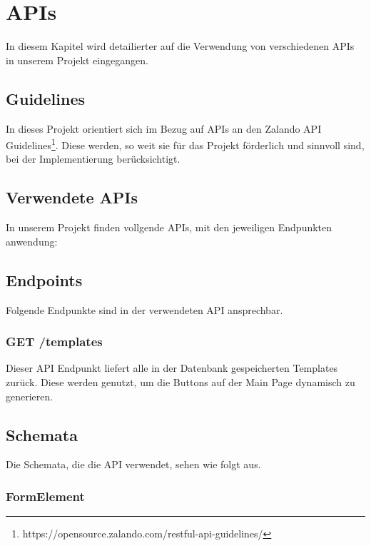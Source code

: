 \chapter{\ac{API}s}\label{ch:apis}
In diesem Kapitel wird detailierter auf die Verwendung von verschiedenen \ac{API}s in unserem Projekt
eingegangen.

\section{Guidelines}
In dieses Projekt orientiert sich im Bezug auf \ac{API}s an den Zalando API Guidelines\footnote{https://opensource.zalando.com/restful-api-guidelines/}. 
Diese werden, so weit sie für das Projekt förderlich und sinnvoll sind, bei der Implementierung 
berücksichtigt.
\section{Verwendete \ac{API}s}
In unserem Projekt finden vollgende \ac{API}s, mit den jeweiligen Endpunkten anwendung:

\section{Endpoints}
Folgende Endpunkte sind in der verwendeten API ansprechbar.

\subsection{GET /templates}

Dieser API Endpunkt liefert alle in der Datenbank gespeicherten Templates zurück. Diese
 werden genutzt, um die Buttons auf der Main Page dynamisch zu generieren.

\section{Schemata}
Die Schemata, die die API verwendet, sehen wie folgt aus.

\subsection{FormElement}
